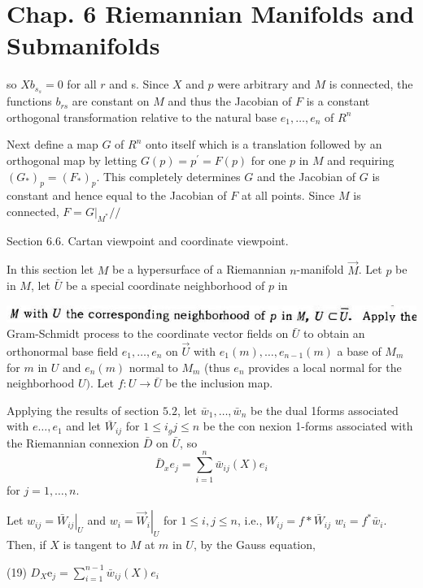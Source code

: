 \documentclass[10pt]{article}
\begin{document}
\section{Chap. 6 Riemannian Manifolds and Submanifolds}
so $X b_{s_{s}}=0$ for all $r$ and s. Since $X$ and $p$ were arbitrary and $M$ is connected, the functions $b_{r s}$ are constant on $M$ and thus the Jacobian of $F$ is a constant orthogonal transformation relative to the natural base $e_{1}, \ldots, e_{n}$ of $R^{n}$

Next define a map $G$ of $R^{n}$ onto itself which is a translation followed by an orthogonal map by letting $G(p)=p^{\prime}=F(p)$ for one $p$ in $M$ and requiring $\left(G_{*}\right)_{p}=\left(F_{*}\right)_{p}$. This completely determines $G$ and the Jacobian of $G$ is constant and hence equal to the Jacobian of $F$ at all points. Since $M$ is connected, $F=\left.G\right|_{M^{*}} / /$

Section 6.6. Cartan viewpoint and coordinate viewpoint.

In this section let $M$ be a hypersurface of a Riemannian $n$-manifold $\vec{M}$. Let $p$ be in $M$, let $\bar{U}$ be a special coordinate neighborhood of $p$ in

\includegraphics[max width=\textwidth]{2022_07_16_f4e476ee2159dc67e746g-44}\\
Gram-Schmidt process to the coordinate vector fields on $\bar{U}$ to obtain an orthonormal base field $e_{1}, \ldots, e_{n}$ on $\vec{U}$ with $e_{1}(m), \ldots, e_{n-1}(m)$ a base of $M_{m}$ for $m$ in $U$ and $e_{n}(m)$ normal to $M_{m}$ (thus $e_{n}$ provides a local normal for the neighborhood $U)$. Let $f: U \rightarrow \bar{U}$ be the inclusion map.

Applying the results of section $5.2$, let $\bar{w}_{1}, \ldots, \bar{w}_{n}$ be the dual 1forms associated with $e \ldots, e_{1}$ and let $\bar{W}_{i j}$ for $1 \leq i_{g} j \leq n$ be the con nexion 1-forms associated with the Riemannian connexion $\bar{D}$ on $\bar{U}$, so
$$
\bar{D}_{x} e_{j}=\sum_{i=1}^{n} \bar{w}_{i j}(X) e_{i}
$$
for $j=1, \ldots, n$.

Let $w_{i j}=\left.\bar{W}_{i j}\right|_{U}$ and $w_{i}=\left.\vec{W}_{i}\right|_{U}$ for $1 \leq i, j \leq n$, i.e., $W_{i j}=f * \bar{W}_{i j}$ $w_{i}=f^{*} \bar{w}_{i}$. Then, if $X$ is tangent to $M$ at $m$ in $U$, by the Gauss equation,

(19) $D_{X} \mathrm{e}_{j}=\sum_{i=1}^{n-1} \bar{w}_{i j}(X) e_{i}$
\end{document}
